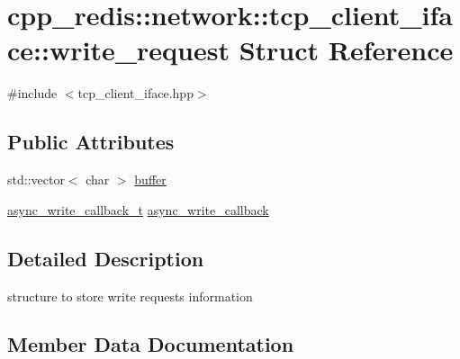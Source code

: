 \hypertarget{structcpp__redis_1_1network_1_1tcp__client__iface_1_1write__request}{}\section{cpp\+\_\+redis\+:\+:network\+:\+:tcp\+\_\+client\+\_\+iface\+:\+:write\+\_\+request Struct Reference}
\label{structcpp__redis_1_1network_1_1tcp__client__iface_1_1write__request}


{\ttfamily \#include $<$tcp\+\_\+client\+\_\+iface.\+hpp$>$}

\subsection*{Public Attributes}
\begin{DoxyCompactItemize}
\item 
std\+::vector$<$ char $>$ \hyperlink{structcpp__redis_1_1network_1_1tcp__client__iface_1_1write__request_ad3567dac827f550b60491af530f0db2e}{buffer}
\item 
\hyperlink{classcpp__redis_1_1network_1_1tcp__client__iface_a1dc52ccc70cf377c4fbb495a16adc658}{async\+\_\+write\+\_\+callback\+\_\+t} \hyperlink{structcpp__redis_1_1network_1_1tcp__client__iface_1_1write__request_ab2823d9836ec68d63c9799ee12d403a2}{async\+\_\+write\+\_\+callback}
\end{DoxyCompactItemize}


\subsection{Detailed Description}
structure to store write requests information 

\subsection{Member Data Documentation}
\mbox{\label{structcpp__redis_1_1network_1_1tcp__client__iface_1_1write__request_ab2823d9836ec68d63c9799ee12d403a2}} 
